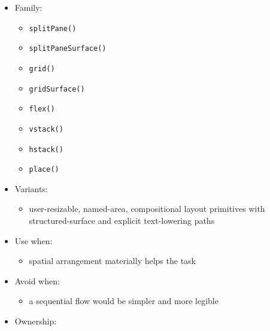 \begin{itemize}
\tightlist
\item
  Family:

  \begin{itemize}
  \tightlist
  \item
    \texttt{s\allowbreak{}p\allowbreak{}l\allowbreak{}i\allowbreak{}t\allowbreak{}P\allowbreak{}a\allowbreak{}n\allowbreak{}e\allowbreak{}(\allowbreak{})}
  \item
    \texttt{s\allowbreak{}p\allowbreak{}l\allowbreak{}i\allowbreak{}t\allowbreak{}P\allowbreak{}a\allowbreak{}n\allowbreak{}e\allowbreak{}S\allowbreak{}u\allowbreak{}r\allowbreak{}f\allowbreak{}a\allowbreak{}c\allowbreak{}e\allowbreak{}(\allowbreak{})}
  \item
    \texttt{g\allowbreak{}r\allowbreak{}i\allowbreak{}d\allowbreak{}(\allowbreak{})}
  \item
    \texttt{g\allowbreak{}r\allowbreak{}i\allowbreak{}d\allowbreak{}S\allowbreak{}u\allowbreak{}r\allowbreak{}f\allowbreak{}a\allowbreak{}c\allowbreak{}e\allowbreak{}(\allowbreak{})}
  \item
    \texttt{f\allowbreak{}l\allowbreak{}e\allowbreak{}x\allowbreak{}(\allowbreak{})}
  \item
    \texttt{v\allowbreak{}s\allowbreak{}t\allowbreak{}a\allowbreak{}c\allowbreak{}k\allowbreak{}(\allowbreak{})}
  \item
    \texttt{h\allowbreak{}s\allowbreak{}t\allowbreak{}a\allowbreak{}c\allowbreak{}k\allowbreak{}(\allowbreak{})}
  \item
    \texttt{p\allowbreak{}l\allowbreak{}a\allowbreak{}c\allowbreak{}e\allowbreak{}(\allowbreak{})}
  \end{itemize}
\item
  Variants:

  \begin{itemize}
  \tightlist
  \item
    user-resizable, named-area, compositional layout primitives with structured-surface and explicit text-lowering paths
  \end{itemize}
\item
  Use when:

  \begin{itemize}
  \tightlist
  \item
    spatial arrangement materially helps the task
  \end{itemize}
\item
  Avoid when:

  \begin{itemize}
  \tightlist
  \item
    a sequential flow would be simpler and more legible
  \end{itemize}
\item
  Ownership:


\end{itemize}
